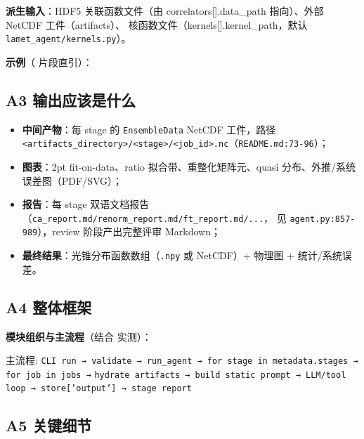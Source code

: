 \documentclass[UTF8]{ctexart}
\begin{document}
\textbf{派生输入}：HDF5 关联函数文件（由 correlators[].data\_path 指向）、外部 NetCDF 工件（artifacts）、
核函数文件（kernels[].kernel\_path，默认 \texttt{lamet\_agent/kernels.py}）。

\textbf{示例}（\texttt{} 片段直引）：



\subsection{A3 输出应该是什么}

\begin{itemize}
\item \textbf{中间产物}：每 stage 的 \texttt{EnsembleData} NetCDF 工件，路径
\texttt{\nolinkurl{<artifacts_directory>/<stage>/<job_id>.nc}}（\texttt{\nolinkurl{README.md:73-96}}）；
\item \textbf{图表}：2pt fit-on-data、ratio 拟合带、重整化矩阵元、quasi 分布、外推/系统误差图（PDF/SVG）；
\item \textbf{报告}：每 stage 双语文档报告（\texttt{\nolinkurl{ca_report.md/renorm_report.md/ft_report.md/...}}，
见 \texttt{\nolinkurl{agent.py:857-989}}），review 阶段产出完整评审 Markdown；
\item \textbf{最终结果}：光锥分布函数数组（\texttt{.npy} 或 NetCDF）+ 物理图 + 统计/系统误差。
\end{itemize}

\subsection{A4 整体框架}

\textbf{模块组织与主流程}（结合 \texttt{} 实测）：

\begin{keybox}
主流程: \textcolor{relation}{\texttt{CLI run → validate → run\_agent → for stage in metadata.stages → for job in jobs →}}
\qquad \textcolor{relation}{\texttt{hydrate artifacts → build static prompt → LLM/tool loop → store['output'] → stage report}}
\end{keybox}



\subsection{A5 关键细节}
\end{document}
